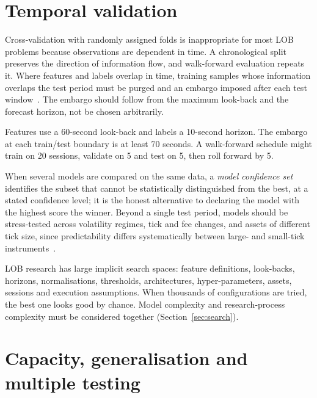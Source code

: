 \section{Temporal validation}
\label{sec:validation}

Cross-validation with randomly assigned folds is inappropriate for most LOB problems because observations are
dependent in time. A chronological split preserves the direction of information flow, and
walk-forward evaluation repeats it. Where features and labels overlap in time, training samples
whose information overlaps the test period must be purged and an embargo imposed after each test
window~\citep{lopezdeprado2018}. The embargo should follow from the maximum look-back and the
forecast horizon, not be chosen arbitrarily.

\begin{example}
Features use a 60-second look-back and labels a 10-second horizon. The embargo at each
train/test boundary is at least 70 seconds. A walk-forward schedule might train on 20 sessions,
validate on 5 and test on 5, then roll forward by 5.
\end{example}

When several models are compared on the same data, a \emph{model confidence set}~\citep{hansen2011mcs}
identifies the subset that cannot be statistically distinguished from the best, at a stated
confidence level; it is the honest alternative to declaring the model with the highest score the
winner. Beyond a single test period, models should be stress-tested across volatility regimes, tick
and fee changes, and assets of different tick size, since predictability differs systematically
between large- and small-tick instruments~\citep{briola2024,gould2016qi}.

LOB research has large implicit search spaces: feature definitions, look-backs, horizons,
normalisations, thresholds, architectures, hyper-parameters, assets, sessions and execution
assumptions. When thousands of configurations are tried, the best one looks good by chance. Model
complexity and research-process complexity must be considered together
(Section~\ref{sec:search}).

\section{Capacity, generalisation and multiple testing}
\label{sec:generalisation}

